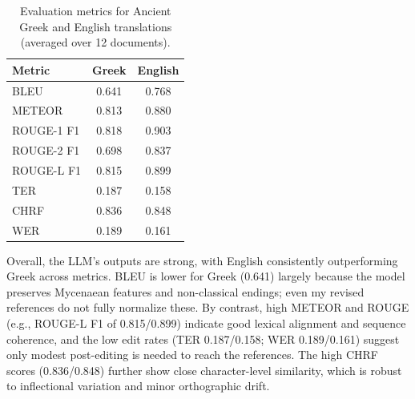 \begin{table}[H]
\centering
\caption{Evaluation metrics for Ancient Greek and English translations (averaged over 12 documents).}
\label{tab:metrics-combined}
\begin{tabular}{|l|c|c|}
\hline
Metric & Greek & English \\
\hline
BLEU        & 0.641 & 0.768 \\
METEOR      & 0.813 & 0.880 \\
ROUGE-1 F1  & 0.818 & 0.903 \\
ROUGE-2 F1  & 0.698 & 0.837 \\
ROUGE-L F1  & 0.815 & 0.899 \\
TER         & 0.187 & 0.158 \\
CHRF        & 0.836 & 0.848 \\
WER         & 0.189 & 0.161 \\
\hline
\end{tabular}
\end{table}

Overall, the LLM's outputs are strong, with English consistently outperforming Greek across metrics. BLEU is lower for Greek (0.641) largely because the model preserves Mycenaean features and non-classical endings; even my revised references do not fully normalize these.
By contrast, high METEOR and ROUGE (e.g., ROUGE-L F1 of 0.815/0.899) indicate good lexical alignment and sequence coherence, and the low edit rates (TER 0.187/0.158; WER 0.189/0.161) suggest only modest post-editing is needed to reach the references.
The high CHRF scores (0.836/0.848) further show close character-level similarity, which is robust to inflectional variation and minor orthographic drift.
